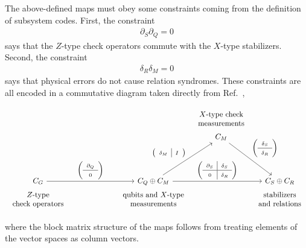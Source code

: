 The above-defined maps must obey some constraints coming from the definition of subsystem codes. First, the constraint 
\begin{align}
\partial_S \partial_Q = 0
\end{align}
says that the $Z$-type check operators commute with the $X$-type stabilizers. Second, the constraint 
\begin{align}
\delta_R \delta_M = 0
\end{align}
says that physical errors do not cause relation syndromes. These constraints are all encoded in a commutative diagram taken directly from Ref.~\cite{KubicaVasmer2022},
\begin{singlespace}
\begin{align}
\begin{tikzcd}[ampersand replacement=\&, column sep = 0, row sep = 0]
\&[6em] \& \begin{array}{c} \text{$X$-type check} \\ \text{measurements} \end{array}  \& \\
\&\& C_M \ar[dr, "{\left(\begin{array}{c} \delta_S\\\hline \delta_R\end{array}\right)}"] \&\\[10ex] 
C_G \ar[r, "{\left(\begin{array}{c} \partial_Q\\\hline 0\end{array}\right)}"] \&
C_Q \oplus C_M \ar[ur, "{\left(\begin{array}{c|c} \delta_M &I\end{array}\right)}"]
\ar[rr, "{\left(\begin{array}{c|c} \partial_S& \delta_S \\\hline 0& \delta_R \end{array}\right)}"]\&\& C_S \oplus C_R\\
\begin{array}{c} \text{$Z$-type} \\ \text{check operators} \end{array} \&
\begin{array}{c} \text{qubits and $X$-type} \\ \text{measurements} \end{array} \& \&
\begin{array}{c} \text{stabilizers} \\ \text{and relations} \end{array}
\end{tikzcd}  \label{eqn:cd}
\end{align}
\end{singlespace}
where the block matrix structure of the maps follows from treating elements of the vector spaces as column vectors.

